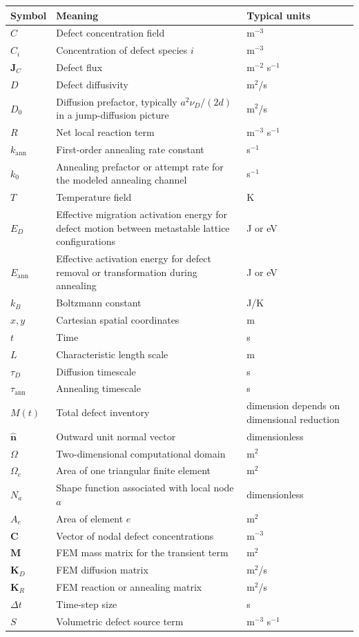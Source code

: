\documentclass[11pt]{article}
\begin{document}
\renewcommand{\arraystretch}{1.25}
\begin{longtable}{p{} p{} p{}}
\toprule
\textbf{Symbol} & \textbf{Meaning} & \textbf{Typical units} \\
\midrule
\endhead
$C$ & Defect concentration field & m$^{-3}$ \\
$C_i$ & Concentration of defect species $i$ & m$^{-3}$ \\
$\mathbf{J}_C$ & Defect flux & m$^{-2}$ s$^{-1}$ \\
$D$ & Defect diffusivity & m$^2$/s \\
$D_0$ & Diffusion prefactor, typically $a^2 \nu_D /(2d)$ in a jump-diffusion picture & m$^2$/s \\
$R$ & Net local reaction term & m$^{-3}$ s$^{-1}$ \\
$k_{\mathrm{ann}}$ & First-order annealing rate constant & s$^{-1}$ \\
$k_0$ & Annealing prefactor or attempt rate for the modeled annealing channel & s$^{-1}$ \\
$T$ & Temperature field & K \\
$E_D$ & Effective migration activation energy for defect motion between metastable lattice configurations & J or eV \\
$E_{\mathrm{ann}}$ & Effective activation energy for defect removal or transformation during annealing & J or eV \\
$k_B$ & Boltzmann constant & J/K \\
$x,y$ & Cartesian spatial coordinates & m \\
$t$ & Time & s \\
$L$ & Characteristic length scale & m \\
$\tau_D$ & Diffusion timescale & s \\
$\tau_{\mathrm{ann}}$ & Annealing timescale & s \\
$M(t)$ & Total defect inventory & dimension depends on dimensional reduction \\
$\hat{\mathbf{n}}$ & Outward unit normal vector & dimensionless \\
$\Omega$ & Two-dimensional computational domain & m$^2$ \\
$\Omega_e$ & Area of one triangular finite element & m$^2$ \\
$N_a$ & Shape function associated with local node $a$ & dimensionless \\
$A_e$ & Area of element $e$ & m$^2$ \\
$\bm{C}$ & Vector of nodal defect concentrations & m$^{-3}$ \\
$\bm{M}$ & FEM mass matrix for the transient term & m$^2$ \\
$\bm{K}_D$ & FEM diffusion matrix & m$^2$/s \\
$\bm{K}_R$ & FEM reaction or annealing matrix & m$^2$/s \\
$\Delta t$ & Time-step size & s \\
$S$ & Volumetric defect source term & m$^{-3}$ s$^{-1}$ \\
\bottomrule
\end{longtable}
\end{document}
